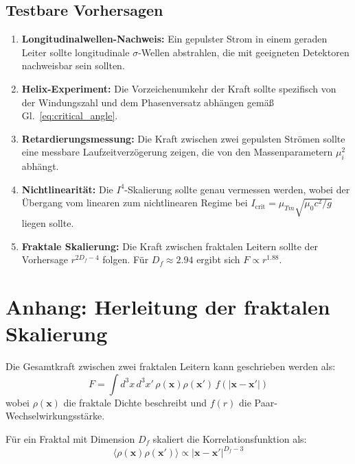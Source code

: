 \documentclass[10pt, a4paper]{article}
\begin{document}
	\subsection{Testbare Vorhersagen}
	\begin{enumerate}
		\item \textbf{Longitudinalwellen-Nachweis:} Ein gepulster Strom in einem geraden Leiter sollte longitudinale $\sigma$-Wellen abstrahlen, die mit geeigneten Detektoren nachweisbar sein sollten.
		
		\item \textbf{Helix-Experiment:} Die Vorzeichenumkehr der Kraft sollte spezifisch von der Windungszahl und dem Phasenversatz abhängen gemäß Gl.~\ref{eq:critical_angle}.
		
		\item \textbf{Retardierungsmessung:} Die Kraft zwischen zwei gepulsten Strömen sollte eine messbare Laufzeitverzögerung zeigen, die von den Massenparametern $\mu_i^2$ abhängt.
		
		\item \textbf{Nichtlinearität:} Die $I^4$-Skalierung sollte genau vermessen werden, wobei der Übergang vom linearen zum nichtlinearen Regime bei $I_{\text{crit}} = \mu_{Tm} \sqrt{\mu_0 c^2 / g}$ liegen sollte.
		
		\item \textbf{Fraktale Skalierung:} Die Kraft zwischen fraktalen Leitern sollte der Vorhersage $r^{2D_f - 4}$ folgen. Für $D_f \approx 2.94$ ergibt sich $F \propto r^{1.88}$.
	\end{enumerate}
	
	\section*{Anhang: Herleitung der fraktalen Skalierung}
	Die Gesamtkraft zwischen zwei fraktalen Leitern kann geschrieben werden als:
	\begin{equation}
		F = \int d^3x \, d^3x' \, \rho(\mathbf{x}) \rho(\mathbf{x}') \, f(|\mathbf{x}-\mathbf{x}'|)
	\end{equation}
	wobei $\rho(\mathbf{x})$ die fraktale Dichte beschreibt und $f(r)$ die Paar-Wechselwirkungsstärke.
	
	Für ein Fraktal mit Dimension $D_f$ skaliert die Korrelationsfunktion als:
	\begin{equation}
		\langle \rho(\mathbf{x}) \rho(\mathbf{x}')\rangle \propto |\mathbf{x}-\mathbf{x}'|^{D_f - 3}
	\end{equation}
	
\end{document}
